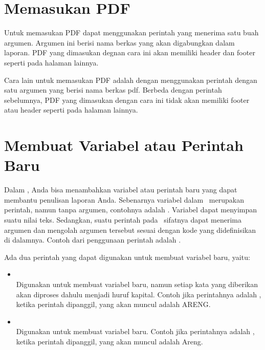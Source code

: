\section{Memasukan PDF}
\label{sec:pdf}
Untuk memasukan PDF dapat menggunakan perintah  yang menerima satu buah argumen.
Argumen ini berisi nama berkas yang akan digabungkan dalam laporan.
PDF yang dimasukan degnan cara ini akan memiliki header dan footer seperti pada halaman lainnya. 


Cara lain untuk memasukan PDF adalah dengan menggunakan perintah  dengan satu argumen yang berisi nama berkas pdf.
Berbeda dengan perintah sebelumnya, PDF yang dimasukan dengan cara ini tidak akan memiliki footer atau header seperti pada halaman lainnya. 



\section{Membuat Variabel atau Perintah Baru}
\label{sec:newCommand}
Dalam \latex, Anda bisa menambahkan variabel atau perintah baru yang dapat membantu penulisan laporan Anda. Sebenarnya variabel dalam \latex~merupakan perintah, namun tanpa argumen, contohnya adalah . Variabel dapat menyimpan suatu nilai teks. Sedangkan, suatu perintah pada \latex~sifatnya dapat menerima argumen dan mengolah argumen tersebut sesuai dengan kode yang didefinisikan di dalamnya. Contoh dari penggunaan perintah adalah .

Ada dua perintah yang dapat digunakan untuk membuat variabel baru, yaitu: 
\begin{itemize}
	\item {} \\
	Digunakan untuk membuat variabel baru, namun setiap kata yang diberikan akan diproses dahulu menjadi huruf kapital. 
	Contoh jika perintahnya adalah , ketika perintah  dipanggil, yang akan muncul adalah ARENG.
	\item {} \\
	Digunakan untuk membuat variabel baru.
	Contoh jika perintahnya adalah , ketika perintah  dipanggil, yang akan muncul adalah Areng.
\end{itemize}

